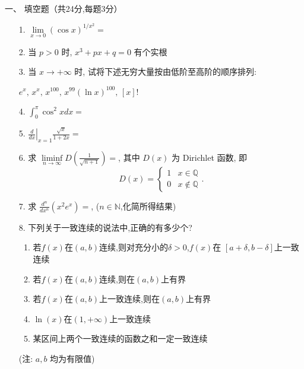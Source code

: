 \documentclass[zihao=-4,twoside]{ctexart} %
\newcommand{\Lim}{\lim\limits}
\newcommand{\Liminf}{\liminf\limits}
\begin{document}
\textsf{一、 填空题（共24分,每题3分）}
    \begin{enumerate}
    \item [1.] $\Lim_{x\to 0}(\cos x)^{1/x^2}=$\underline{\quad\quad\quad\quad}
      \vspace{0.2in}

    \item [2.] 当 $p>0$ 时, $x^3+px+q=0$ 有\underline{\quad\quad\quad\quad}个实根
      \vspace{0.2in}
      
    \item [3.] 当 $x\to+\infty$ 时, 试将下述无穷大量按由低阶至高阶的顺序排列:\par
      $e^x, \, x^x,\, x^{100},\,x^{99}(\ln x)^{100},\,
      [x]!$ \underline{\quad\quad\quad\quad\quad\quad\quad\quad\quad\quad\quad\quad}
      \vspace{0.2in}

    \item [4.] $\int_0^\pi \cos^2 x dx =$ \underline{\quad\quad\quad\quad}
      \vspace{0.2in}

    \item [5.]
      $\left.\frac{d}{dx}\right|_{x=1}\frac{\sqrt{x}}{1+2x}=$\underline{\quad\quad\quad\quad}
      \vspace{0.2in}

    \item [6.] 求 $\Liminf_{n\to\infty}D(\frac1{\sqrt
        {n+1}})=$\underline{\quad\quad\quad\quad}, 其中 $D(x)$ 为 Dirichlet 函数,
      即
      $$D(x)=
      \begin{cases}
        1 & x\in \mathbb{Q}\\
        0 & x\not\in \mathbb{Q}
      \end{cases}.
      $$
      \vspace{0.2in}

    \item [7.] 求 $\frac{d^n}{dx^n}(x^2e^x)=$\underline{\quad\quad\quad\quad\quad\quad\quad\quad},
      ($n\in\mathbb{N}$,化简所得结果)
      \vspace{0.2in}
 
    \item [8.] 下列关于一致连续的说法中,正确的有多少个?\underline{\quad\quad\quad\quad}
      \begin{enumerate}
      \item 若$f(x)$在$(a,b)$连续,则对充分小的$\delta>0$,$f(x)$在
        $[a+\delta,b-\delta]$上一致连续
      \item 若$f(x)$在$(a,b)$连续,则在$(a,b)$上有界
      \item 若$f(x)$在$(a,b)$上一致连续,则在$(a,b)$上有界
      \item $\ln(x)$在$(1,+\infty)$上一致连续
      \item 某区间上两个一致连续的函数之和一定一致连续
      \end{enumerate}
      (注: $a,b$ 均为有限值)
    \end{enumerate}
\end{document}
